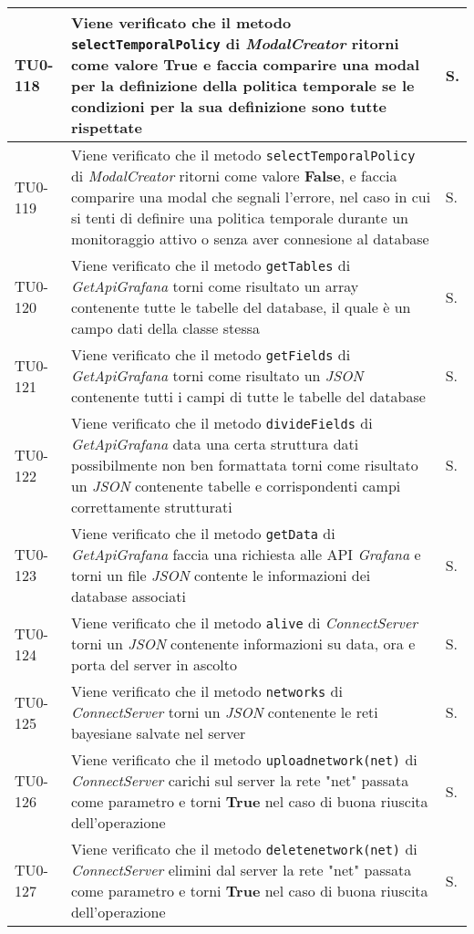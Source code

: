 \begin{longtable}{|C{.15\textwidth}|m{.66\textwidth}|C{.10\textwidth}|}
\hline
TU0-118 & Viene verificato che il metodo \texttt{selectTemporalPolicy} di \textit{ModalCreator} ritorni come valore \textbf{True} e faccia comparire una modal per la definizione della politica temporale se le condizioni per la sua definizione sono tutte rispettate & S. \\
\hline
{}TU0-119 & Viene verificato che il metodo \texttt{selectTemporalPolicy} di \textit{ModalCreator} ritorni come valore \textbf{False}, e faccia comparire una modal che segnali l'errore, nel caso in cui si tenti di definire una politica temporale durante un monitoraggio attivo o senza aver connesione al database & S. \\
\hline
TU0-120 & Viene verificato che il metodo \texttt{getTables} di \textit{GetApiGrafana} torni come risultato un array contenente tutte le tabelle del database, il quale è un campo dati della classe stessa & S.\\
\hline
{}TU0-121 & Viene verificato che il metodo \texttt{getFields} di \textit{GetApiGrafana} torni come risultato un \textit{JSON} contenente tutti i campi di tutte le tabelle del database & S.\\
\hline
TU0-122 & Viene verificato che il metodo \texttt{divideFields} di \textit{GetApiGrafana} data una certa struttura dati possibilmente non ben formattata torni come risultato un \textit{JSON} contenente tabelle e corrispondenti campi correttamente strutturati & S.\\
\hline
{}TU0-123 & Viene verificato che il metodo \texttt{getData} di \textit{GetApiGrafana} faccia una richiesta alle API \textit{Grafana} e torni un file \textit{JSON} contente le informazioni dei database associati & S.\\
\hline
TU0-124 & Viene verificato che il metodo \texttt{alive} di \textit{ConnectServer} torni un \textit{JSON} contenente informazioni su data, ora e porta del server in ascolto & S.\\
\hline
{}TU0-125 & Viene verificato che il metodo \texttt{networks} di \textit{ConnectServer} torni un \textit{JSON} contenente le reti bayesiane salvate nel server & S.\\
\hline
TU0-126 & Viene verificato che il metodo \texttt{uploadnetwork(net)} di \textit{ConnectServer} carichi sul server la rete "net" passata come parametro e torni \textbf{True} nel caso di buona riuscita dell'operazione & S.\\
\hline
{}TU0-127 & Viene verificato che il metodo \texttt{deletenetwork(net)} di \textit{ConnectServer} elimini dal server la rete "net" passata come parametro e torni \textbf{True} nel caso di buona riuscita dell'operazione & S.\\

\end{longtable}
